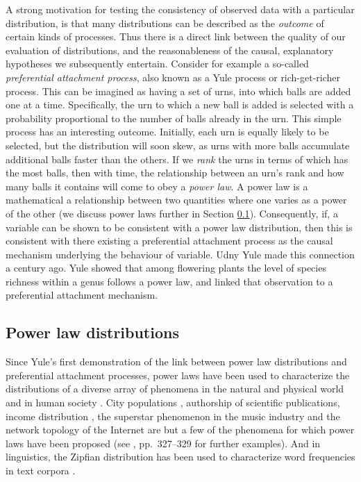 A strong motivation for testing the consistency of observed data with a particular distribution, is that many distributions can be described as the \emph{outcome} of certain kinds of processes. Thus there is a direct link between the quality of our evaluation of distributions, and the reasonableness of the causal, explanatory hypotheses we subsequently entertain. Consider for example a so-called \emph{preferential attachment process}, also known as a Yule process or rich-get-richer process. This can be imagined as having a set of urns, into which balls are added one at a time. Specifically, the urn to which a new ball is added is selected with a probability proportional to the number of balls already in the urn. This simple process has an interesting outcome. Initially, each urn is equally likely to be selected, but the distribution will soon skew, as urns with more balls accumulate additional balls faster than the others. If we \emph{rank} the urns in terms of which has the most balls, then with time, the relationship between an urn's rank and how many balls it contains will come to obey a \emph{power law}. A power law is a mathematical a relationship between two quantities where one varies as a power of the other (we discuss power laws further in Section \ref{power-laws}). Consequently, if, a variable can be shown to be consistent with a power law distribution, then this is consistent with there existing a preferential attachment process as the causal mechanism underlying the behaviour of variable. Udny Yule \autocites*{yule_mathematical_1925}[see also][]{albert_species_2011} made this connection a century ago. Yule showed that among flowering plants the level of species richness within a genus follows a power law, and linked that observation to a preferential attachment mechanism.

\hypertarget{power-laws}{%
\subsection{Power law distributions}\label{power-laws}}

Since Yule's first demonstration of the link between power law distributions and preferential attachment processes, power laws have been used to characterize the distributions of a diverse array of phenomena in the natural and physical world and in human society \autocite[p.~661]{clauset_power-law_2009}. City populations \autocites{gabaix_zipfs_1999}{levy_gibrats_2009}{malevergne_testing_2011}, authorship of scientific publications, income distribution \autocite{simon_class_1955}, the superstar phenomenon in the music industry \autocite{chung_stochastic_1994} and the network topology of the Internet \autocite{faloutsos_power-law_1999} are but a few of the phenomena for which power laws have been proposed (see \textcite{newman_power_2005}, pp.~327--329 for further examples). And in linguistics, the Zipfian distribution has been used to characterize word frequencies in text corpora \autocites{estoup_gammes_1916}{zipf_selective_1932}{zipf_human_1949}.

